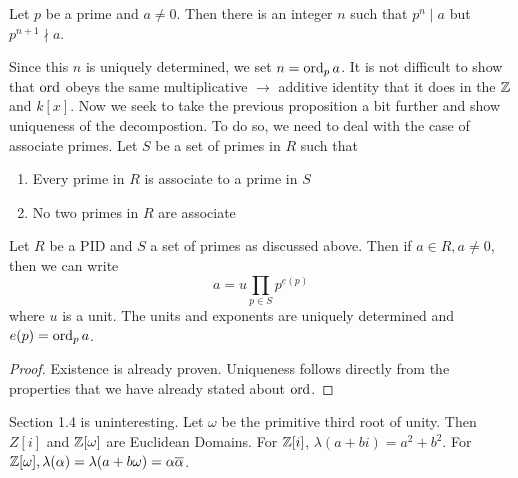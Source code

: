 \begin{lemma}
  Let \(p\) be a prime and \(a\neq 0\). Then there is an integer \(n\) such that
  \(p ^{n} \mid a\) but \(p ^{n+1} \nmid a\).
\end{lemma}

Since this \(n\) is uniquely determined, we set \(n = \operatorname{ord}_{p} a\). It is not
difficult to show that \(\operatorname{ord}\) obeys the same multiplicative \(\to \) additive
identity that it does in the \(\mathbb{Z} \) and \(k[x]\). Now we seek to take the
previous proposition a bit further and show uniqueness of the decompostion. To
do so, we need to deal with the case of associate primes. Let \(S\) be a set of
primes in \(R\) such that
\begin{enumerate}
  \item Every prime in \(R\) is associate to a prime in \(S\)
  \item No two primes in \(R\) are associate
\end{enumerate}

\begin{theorem}
  Let \(R\) be a PID and \(S\) a set of primes as discussed above. Then if
  \(a \in R, a \neq 0\), then we can write
  \[
    a = u \prod_{p \in S} p^{e(p)}
  \]
  where \(u\) is a unit. The units and exponents are uniquely determined and
  \(e(p)=\operatorname{ord}_p a\).
\end{theorem}

\begin{proof}
  Existence is already proven. Uniqueness follows directly from the properties
  that we have already stated about \(\operatorname{ord}\).
\end{proof}

\begin{remark}
  Section 1.4 is uninteresting. Let \(\omega\) be the primitive third root of
  unity. Then \(Z[i]\) and \(\mathbb{Z} [\omega]\) are Euclidean Domains. For
  \(\mathbb{Z} [i]\), \(\lambda(a+bi)=a^2+b^2\). For
  \(\mathbb{Z} [\omega], \lambda(\alpha)=\lambda(a+b\omega)=\alpha \overline{\alpha}\).
\end{remark}
